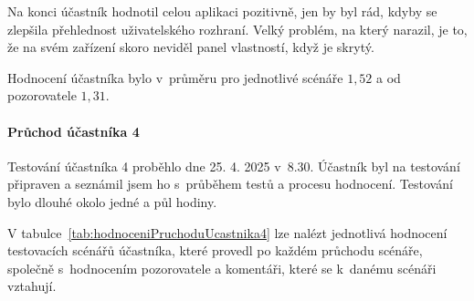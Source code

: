 Na konci účastník hodnotil celou aplikaci pozitivně, jen by byl rád, kdyby se zlepšila přehlednost uživatelského rozhraní.
Velký problém, na který narazil, je to, že na svém zařízení skoro neviděl panel vlastností, když je skrytý. 

Hodnocení účastníka bylo v~průměru pro jednotlivé scénáře $1,52$ a od pozorovatele $1,31$.



\paragraph{Průchod účastníka 4}

Testování účastníka 4 proběhlo dne 25. 4. 2025 v~8.30. 
Účastník byl na testování připraven a seznámil jsem ho s~průběhem testů a procesu hodnocení. 
Testování bylo dlouhé okolo jedné a půl hodiny.

V tabulce~\ref{tab:hodnoceniPruchoduUcastnika4} lze nalézt jednotlivá hodnocení testovacích scénářů účastníka, které provedl po každém průchodu scénáře, společně s~hodnocením pozorovatele a komentáři, které se k~danému scénáři vztahují.


